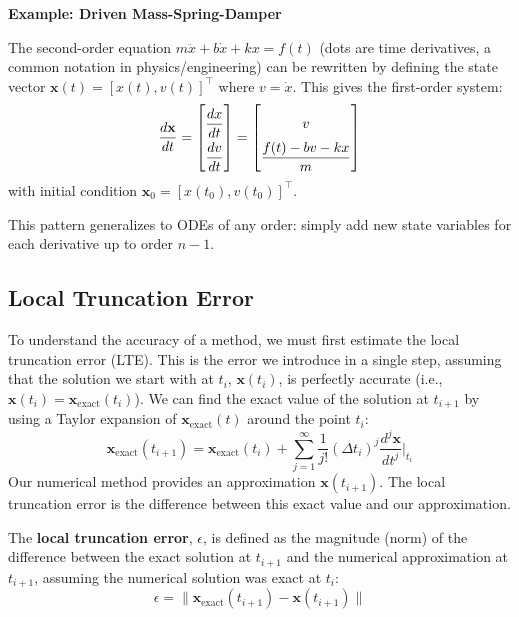 \begin{exampleBox}
\textbf{Example: Driven Mass-Spring-Damper}

The second-order equation $m\ddot{x} + b\dot{x} + kx = f(t)$ (dots are time derivatives, a common notation in physics/engineering) can be rewritten by defining the state vector $\mathbf{x}(t) = [x(t), v(t)]^\top$ where $v = \dot{x}$. This gives the first-order system:
\begin{equation}
    \frac{d\mathbf{x}}{dt} = {\renewcommand{\arraystretch}{2}
    \begin{bmatrix} \dfrac{dx}{dt} \\ \dfrac{dv}{dt} \end{bmatrix} = \begin{bmatrix} v \\ \dfrac{f(t) - bv - kx}{m} \end{bmatrix}}
\end{equation}
with initial condition $\mathbf{x}_0 = [x(t_0), v(t_0)]^\top$.
\end{exampleBox}

This pattern generalizes to ODEs of any order: simply add new state variables for each derivative up to order $n-1$.

\subsection{Local Truncation Error}
To understand the accuracy of a method, we must first estimate the local truncation error (LTE). This is the error we introduce in a single step, assuming that the solution we start with at $t_i$, $\mathbf{x}(t_i)$, is perfectly accurate (i.e., $\mathbf{x}(t_i) = \mathbf{x}_{\text{exact}}(t_i)$). We can find the exact value of the solution at $t_{i+1}$ by using a Taylor expansion of $\mathbf{x}_{\text{exact}}(t)$ around the point $t_i$:
\begin{equation}
    \mathbf{x}_{\text{exact}}(t_{i+1}) = \mathbf{x}_{\text{exact}}(t_i) + \sum_{j=1}^{\infty} \frac{1}{j!} (\Delta t_i)^j \frac{d^j \mathbf{x}}{dt^j} \bigg|_{t_i}
\end{equation}
Our numerical method provides an approximation $\mathbf{x}(t_{i+1})$. The local truncation error is the difference between this exact value and our approximation.

\begin{definitionBox}
The \textbf{local truncation error}, $\epsilon$, is defined as the magnitude (norm) of the difference between the exact solution at $t_{i+1}$ and the numerical approximation at $t_{i+1}$, assuming the numerical solution was exact at $t_i$:
\begin{equation}
\epsilon = \| \mathbf{x}_{\text{exact}}(t_{i+1}) - \mathbf{x}(t_{i+1}) \|
\end{equation}
\end{definitionBox}

